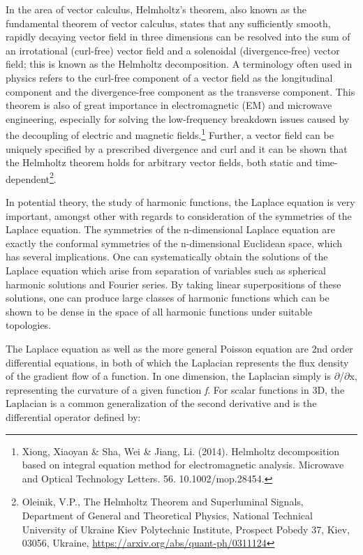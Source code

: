 \documentclass[a4paper]{article}
\newcommand\textstyleNone[1]{#1}
\begin{document}
{
\textstyleNone{{In the area of vector calculus, Helmholtz's theorem,
also known as the fundamental theorem of vector calculus, states that any sufficiently smooth, rapidly decaying vector
field in three dimensions can be resolved into the sum of an irrotational (curl-free) vector field and a solenoidal
(divergence-free) vector field; this is known as the Helmholtz decomposition. A terminology often used in physics
refers to the curl-free component of a vector field as the longitudinal component and the divergence-free component as
the transverse component. This theorem is also of great importance in electromagnetic (EM) and microwave engineering,
especially for solving the low-frequency breakdown issues caused by the decoupling of electric and magnetic
fields.}}\footnote{ Xiong, Xiaoyan \& Sha, Wei \& Jiang, Li. (2014). Helmholtz decomposition based on integral equation
method for electromagnetic analysis. Microwave and Optical Technology Letters. 56. 10.1002/mop.28454.\par
}\textstyleNone{{\textsuperscript{
}}{Further, a vector field can be uniquely specified by a
prescribed divergence and curl and it can be shown that the Helmholtz theorem holds for arbitrary vector fields, both
static and time-dependent}}\footnote{\textstyleNone{ Oleinik, V.P., The Helmholtz Theorem and Superluminal Signals,
Department of General and Theoretical Physics, National Technical University of Ukraine {\textquotedbl}Kiev Polytechnic
Institute{\textquotedbl}, Prospect Pobedy 37, Kiev, 03056, Ukraine,
}\url{https://arxiv.org/abs/quant-ph/0311124}\textstyleNone{ }\par
}\textstyleNone{{.}}}

{
\textstyleNone{In potential theory, the study of harmonic functions, the Laplace equation is very important, amongst
other with regards to consideration of the symmetries of the Laplace equation. The symmetries of the n-dimensional
Laplace equation are exactly the conformal symmetries of the n-dimensional Euclidean space, which has several
implications. One can systematically obtain the solutions of the Laplace equation which arise from separation of
variables such as spherical harmonic solutions and Fourier series. By taking linear superpositions of these solutions,
one can produce large classes of harmonic functions which can be shown to be dense in the space of all harmonic
functions under suitable topologies. }}

{
\textstyleNone{The Laplace equation as well as the more general Poisson equation are 2nd order differential equations,
in both of which the Laplacian represents the flux density of the gradient flow of a function. In one dimension, the
Laplacian simply is ${\partial}${\texttwosuperior}/${\partial}$x{\texttwosuperior}, representing the curvature of a
given function \textit{f}. For scalar functions in 3D, the Laplacian is a }common generalization of the second
derivative and is the differential operator defined by:}
\end{document}
